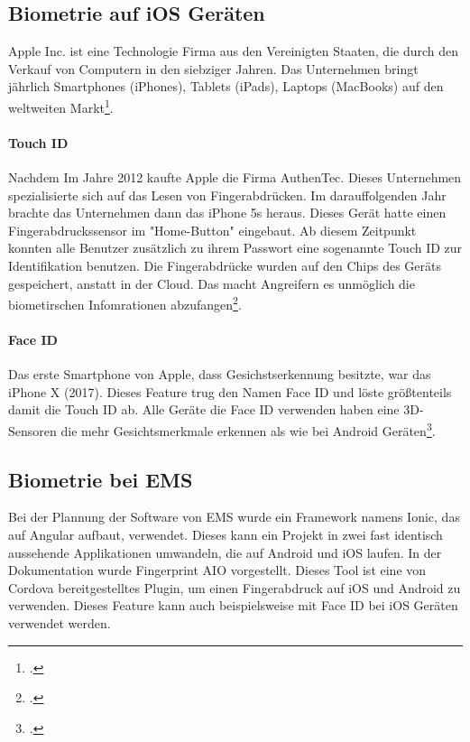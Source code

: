 \subsection{Biometrie auf iOS Geräten}
Apple Inc. ist eine Technologie Firma aus den Vereinigten Staaten, die durch den Verkauf von Computern in den siebziger Jahren. Das Unternehmen bringt jährlich Smartphones (iPhones), Tablets (iPads), Laptops (MacBooks) auf den weltweiten Markt\footcite{apple}.
\paragraph{Touch ID}
Nachdem 
Im Jahre 2012 kaufte Apple die Firma AuthenTec. Dieses Unternehmen spezialisierte sich auf das Lesen von Fingerabdrücken.
Im darauffolgenden Jahr brachte das Unternehmen dann das iPhone 5s heraus. Dieses Gerät hatte einen Fingerabdruckssensor im "Home-Button" eingebaut. Ab diesem Zeitpunkt konnten alle Benutzer zusätzlich zu ihrem Passwort eine sogenannte Touch ID zur Identifikation benutzen.
Die Fingerabdrücke wurden auf den Chips des Geräts gespeichert, anstatt in der Cloud. Das macht Angreifern es unmöglich die biometirschen Infomrationen abzufangen\footcite{touchid}.
\paragraph{Face ID}
Das erste Smartphone von Apple, dass Gesichstserkennung besitzte, war das iPhone X (2017). Dieses Feature trug den Namen Face ID und löste größtenteils damit die Touch ID ab.
Alle Geräte die Face ID verwenden haben eine 3D-Sensoren die mehr Gesichtsmerkmale erkennen als wie bei Android Geräten\footcite{faceid}.


\subsection{Biometrie bei EMS}
Bei der Plannung der Software von EMS wurde ein Framework namens Ionic, das auf Angular aufbaut, verwendet. Dieses kann ein Projekt in zwei fast identisch aussehende Applikationen umwandeln, die auf Android und iOS laufen.
In der Dokumentation wurde Fingerprint AIO vorgestellt. Dieses Tool ist eine von Cordova bereitgestelltes Plugin, um einen Fingerabdruck auf iOS und Android zu verwenden.
Dieses Feature kann auch beispielsweise mit Face ID bei iOS Geräten verwendet werden.

